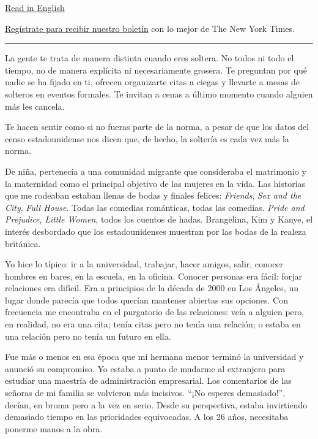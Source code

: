 \href{https://www.nytimes3xbfgragh.onion/2020/08/07/style/modern-love-when-marriage-is-just-another-overhyped-nightclub.html}{Read
in English}

\href{https://www.nytimes3xbfgragh.onion/newsletters/el-times}{Regístrate
para recibir nuestro boletín} con lo mejor de The New York Times.

\begin{center}\rule{0.5\linewidth}{\linethickness}\end{center}

La gente te trata de manera distinta cuando eres soltera. No todos ni
todo el tiempo, no de manera explícita ni necesariamente grosera. Te
preguntan por qué nadie se ha fijado en ti, ofrecen organizarte citas a
ciegas y llevarte a mesas de solteros en eventos formales. Te invitan a
cenas a último momento cuando alguien más les cancela.

Te hacen sentir como si no fueras parte de la norma, a pesar de que los
datos del censo estadounidense nos dicen que, de hecho, la soltería es
cada vez más la norma.

De niña, pertenecía a una comunidad migrante que consideraba el
matrimonio y la maternidad como el principal objetivo de las mujeres en
la vida. Las historias que me rodeaban estaban llenas de bodas y finales
felices: \emph{Friends}, \emph{Sex and the City}, \emph{Full House}.
Todas las comedias románticas, todas las comedias. \emph{Pride and
Prejudice}, \emph{Little Women}, todos los cuentos de hadas. Brangelina,
Kim y Kanye, el interés desbordado que los estadounidenses muestran por
las bodas de la realeza británica.

Yo hice lo típico: ir a la universidad, trabajar, hacer amigos, salir,
conocer hombres en bares, en la escuela, en la oficina. Conocer personas
era fácil: forjar relaciones era difícil. Era a principios de la década
de 2000 en Los Ángeles, un lugar donde parecía que todos querían
mantener abiertas sus opciones. Con frecuencia me encontraba en el
purgatorio de las relaciones: veía a alguien pero, en realidad, no era
una cita; tenía citas pero no tenía una relación; o estaba en una
relación pero no tenía un futuro en ella.

Fue más o menos en esa época que mi hermana menor terminó la universidad
y anunció su compromiso. Yo estaba a punto de mudarme al extranjero para
estudiar una maestría de administración empresarial. Los comentarios de
las señoras de mi familia se volvieron más incisivos. ``¡No esperes
demasiado!'', decían, en broma pero a la vez en serio. Desde su
perspectiva, estaba invirtiendo demasiado tiempo en las prioridades
equivocadas. A los 26 años, necesitaba ponerme manos a la obra.


